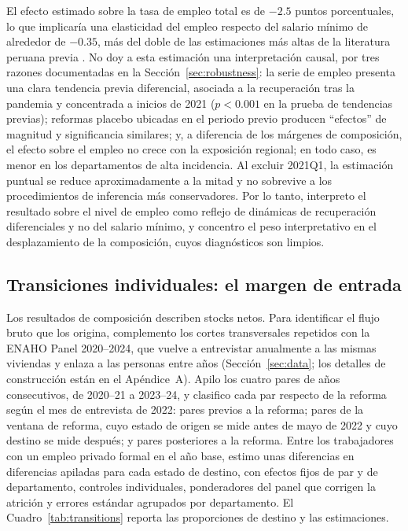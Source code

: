 El efecto estimado sobre la tasa de empleo total es de $-2.5$ puntos porcentuales, lo que implicaría una elasticidad del empleo respecto del salario mínimo de alrededor de $-0.35$, más del doble de las estimaciones más altas de la literatura peruana previa \citep{cespedes_2005}. No doy a esta estimación una interpretación causal, por tres razones documentadas en la Sección~\ref{sec:robustness}: la serie de empleo presenta una clara tendencia previa diferencial, asociada a la recuperación tras la pandemia y concentrada a inicios de 2021 ($p<0.001$ en la prueba de tendencias previas); reformas placebo ubicadas en el periodo previo producen ``efectos'' de magnitud y significancia similares; y, a diferencia de los márgenes de composición, el efecto sobre el empleo no crece con la exposición regional; en todo caso, es menor en los departamentos de alta incidencia. Al excluir 2021Q1, la estimación puntual se reduce aproximadamente a la mitad y no sobrevive a los procedimientos de inferencia más conservadores. Por lo tanto, interpreto el resultado sobre el nivel de empleo como reflejo de dinámicas de recuperación diferenciales y no del salario mínimo, y concentro el peso interpretativo en el desplazamiento de la composición, cuyos diagnósticos son limpios.

\subsection{Transiciones individuales: el margen de entrada}\label{sec:transitions}

Los resultados de composición describen stocks netos. Para identificar el flujo bruto que los origina, complemento los cortes transversales repetidos con la ENAHO Panel 2020--2024, que vuelve a entrevistar anualmente a las mismas viviendas y enlaza a las personas entre años (Sección~\ref{sec:data}; los detalles de construcción están en el Apéndice~A). Apilo los cuatro pares de años consecutivos, de 2020--21 a 2023--24, y clasifico cada par respecto de la reforma según el mes de entrevista de 2022: pares previos a la reforma; pares de la ventana de reforma, cuyo estado de origen se mide antes de mayo de 2022 y cuyo destino se mide después; y pares posteriores a la reforma. Entre los trabajadores con un empleo privado formal en el año base, estimo unas diferencias en diferencias apiladas para cada estado de destino, con efectos fijos de par y de departamento, controles individuales, ponderadores del panel que corrigen la atrición y errores estándar agrupados por departamento. El Cuadro~\ref{tab:transitions} reporta las proporciones de destino y las estimaciones.

